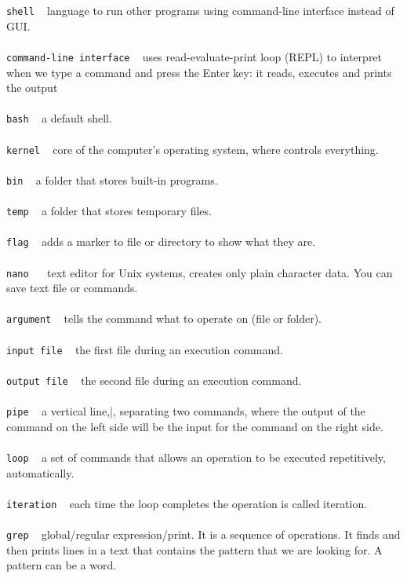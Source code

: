 \documentclass{article}
\begin{document}
\texttt{shell} ~ language to run other programs using command-line interface instead of GUI.\\
\\
\texttt{command-line interface} ~ uses read-evaluate-print loop (REPL) to interpret when we type a command and press the Enter key: it reads, executes and prints the output\\
\\
\texttt{bash} ~	a default shell.\\
\\
\texttt{kernel} ~ core of the computer's operating system, where controls everything. \\
\\
\texttt{bin} ~ a folder that stores built-in programs.\\
\\
\texttt{temp} ~ a folder that stores temporary files.\\
\\
\texttt{flag} ~ adds a marker to file or directory to show what they are.\\
\\
\texttt{nano	} ~	text editor for Unix systems, creates only plain character data. You can save text file or commands. \\
\\
\texttt{argument} ~	tells the command what to operate on (file or folder).\\
\\
\texttt{input file} ~ the first file during an execution command. \\
\\
\texttt{output file} ~ the second file during an execution command.\\
\\
\texttt{pipe} ~ a vertical line,|, separating two commands, where the output of the command on the left side will be the input for the command on the right side.\\
\\
\texttt{loop} ~ a set of commands that allows an operation to be executed repetitively, automatically.\\
\\
\texttt{iteration} ~ each time the loop completes the operation is called iteration.\\  
\\
\texttt{grep} ~ global/regular expression/print. It is a sequence of operations. It finds and then prints lines in a text that contains the pattern that we are looking for. A pattern can be a word.\\
\end{document}
